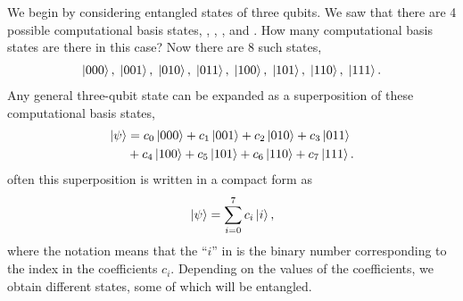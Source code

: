 We begin by considering entangled states of three qubits.
We saw that there are 4 possible computational basis states, , , , and .
How many computational basis states are there in this case?
Now there are 8 such states,
\begin{align}
    \left| 000 \right\rangle, \; \left| 001 \right\rangle, \; \left| 010 \right\rangle, \; \left| 011 \right\rangle, \; \left| 100 \right\rangle, \; \left| 101 \right\rangle, \; \left| 110 \right\rangle, \; \left| 111 \right\rangle.
\end{align}
Any general three-qubit state can be expanded as a superposition of these computational basis states,
\begin{align}
    \left| \psi \right\rangle & = c_0\left| 000 \right\rangle + c_1\left| 001 \right\rangle + c_2\left| 010 \right\rangle + c_3\left| 011 \right\rangle \nonumber\\
    & + c_4\left| 100 \right\rangle + c_5\left| 101 \right\rangle + c_6\left| 110 \right\rangle + c_7\left| 111 \right\rangle.
\end{align}
often this superposition is written in a compact form as
\begin{equation}
    \left| \psi \right\rangle = \sum_{i=0}^7 c_i \left| i \right\rangle,
\end{equation}
where the notation means that the ``$i$'' in  is the binary number corresponding to the index in the coefficients $c_i$.
Depending on the values of the coefficients, we obtain different states, some of which will be entangled.

